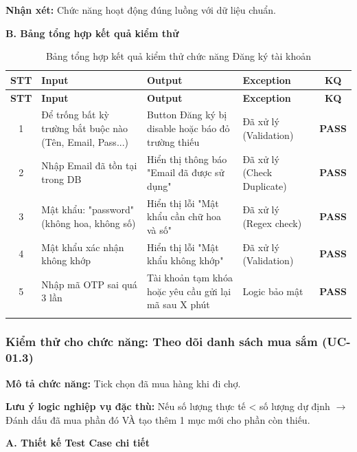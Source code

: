 \textbf{Nhận xét:} Chức năng hoạt động đúng luồng với dữ liệu chuẩn.

\vspace{0.5cm}
\textbf{B. Bảng tổng hợp kết quả kiểm thử}

\begin{longtable}{|c|p{4cm}|p{4.5cm}|p{3cm}|c|}
\hline
\textbf{STT} & \textbf{Input} & \textbf{Output} & \textbf{Exception} & \textbf{KQ} \\
\hline
\endfirsthead
\hline
\textbf{STT} & \textbf{Input} & \textbf{Output} & \textbf{Exception} & \textbf{KQ} \\
\hline
\endhead
1 & Để trống bất kỳ trường bắt buộc nào (Tên, Email, Pass...) & Button Đăng ký bị disable hoặc báo đỏ trường thiếu & Đã xử lý (Validation) & \textbf{PASS} \\
\hline
2 & Nhập Email đã tồn tại trong DB & Hiển thị thông báo "Email đã được sử dụng" & Đã xử lý (Check Duplicate) & \textbf{PASS} \\
\hline
3 & Mật khẩu: "password" (không hoa, không số) & Hiển thị lỗi "Mật khẩu cần chữ hoa và số" & Đã xử lý (Regex check) & \textbf{PASS} \\
\hline
4 & Mật khẩu xác nhận không khớp & Hiển thị lỗi "Mật khẩu không khớp" & Đã xử lý (Validation) & \textbf{PASS} \\
\hline
5 & Nhập mã OTP sai quá 3 lần & Tài khoản tạm khóa hoặc yêu cầu gửi lại mã sau X phút & Logic bảo mật & \textbf{PASS} \\
\hline
\caption{Bảng tổng hợp kết quả kiểm thử chức năng Đăng ký tài khoản}
\end{longtable}

\subsubsection{Kiểm thử cho chức năng: Theo dõi danh sách mua sắm (UC-01.3)}

\textbf{Mô tả chức năng:} Tick chọn đã mua hàng khi đi chợ.

\textbf{Lưu ý logic nghiệp vụ đặc thù:} Nếu số lượng thực tế < số lượng dự định $\rightarrow$ Đánh dấu đã mua phần đó VÀ tạo thêm 1 mục mới cho phần còn thiếu.

\vspace{0.5cm}
\textbf{A. Thiết kế Test Case chi tiết}

